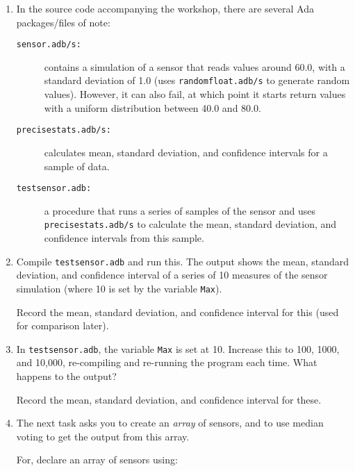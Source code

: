 \documentclass{article}
\begin{document}
\begin{enumerate}

\item In the source code accompanying the workshop, there are several Ada packages/files of note:

  \begin{description}
    \item [\tt sensor.adb/s:] contains a simulation of a sensor       that reads values around 60.0, with a standard deviation of 1.0 (uses {\tt  randomfloat.adb/s} to generate random values). However, it can also fail, at which point it starts return values with a uniform distribution between 40.0 and 80.0.

    \item [\tt precisestats.adb/s:] calculates mean, standard  deviation, and confidence intervals for a sample of data.

    \item [\tt testsensor.adb:] a procedure that runs a series of       samples of the sensor and uses {\tt precisestats.adb/s} to       calculate the mean, standard deviation, and confidence intervals       from this sample.
  \end{description}

\item Compile {\tt testsensor.adb} and run this. The output shows the mean, standard deviation, and confidence interval of a series of 10 measures of the sensor simulation (where 10 is set by the variable \texttt{Max}).

 Record the mean, standard deviation, and confidence interval for this (used for comparison later).

 \item In \texttt{testsensor.adb}, the variable \texttt{Max} is set at 10. Increase this to 100, 1000, and 10,000, re-compiling and re-running  the program each time. What happens to the output?

 Record the mean, standard deviation, and confidence interval for these.

\item The next task asks you to create an {\em array} of sensors, and to use median voting to get the output from this array.

 For, declare an array of sensors using:

\quad{}

\quad{}



\end{enumerate}
\end{document}
